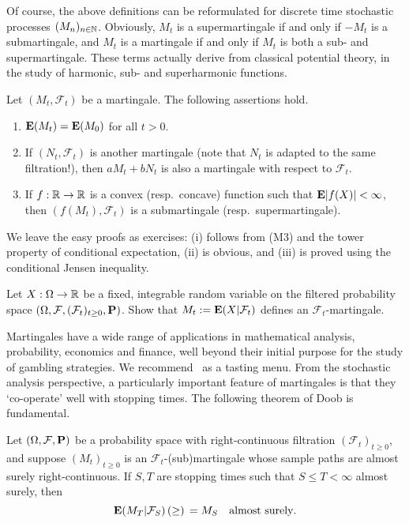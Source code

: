 Of course, the above definitions can be reformulated for discrete time stochastic processes $(M_n)_{n\in\mathbb{N}}$. Obviously, $M_t$ is a supermartingale if and only if $-M_t$ is a submartingale, and $M_t$ is a martingale if and only if $M_t$ is both a sub- and supermartingale. These terms actually derive from classical potential theory, in the study of harmonic, sub- and superharmonic functions.

\begin{proposition}
Let $(M_t,\mathcal{F}_t)$ be a martingale. The following assertions hold.
\begin{enumerate}[\upshape (i)]
    \item $\mathbf{E}(M_t) = \mathbf{E}(M_0)$ for all $t > 0$.
    \item If $(N_t,\mathcal{F}_t)$ is another martingale (note that $N_t$ is adapted to the same filtration!), then $aM_t + bN_t$ is also a martingale with respect to $\mathcal{F}_t$.
    \item If $f:\mathbb{R}\to\mathbb{R}$ is a convex (resp.\ concave) function such that $\mathbf{E}|f(X)| <\infty$, then $(f(M_t),\mathcal{F}_t)$ is a submartingale (resp.\ supermartingale).
\end{enumerate}
\end{proposition}
We leave the easy proofs as exercises: (i) follows from (M3) and the tower property of conditional expectation, (ii) is obvious, and (iii) is proved using the conditional Jensen inequality.

\begin{exercise}
Let $X:\Omega\to\mathbb{R}$ be a fixed, integrable random variable on the filtered probability space $(\Omega,\mathcal{F},(\mathcal{F}_t)_{t\ge 0},\mathbf{P})$. Show that $M_t:=\mathbf{E}(X|\mathcal{F}_t)$ defines an $\mathcal{F}_t$-martingale.
\end{exercise}

Martingales have a wide range of applications in mathematical analysis, probability, economics and finance, well beyond their initial purpose for the study of gambling strategies. We recommend~\cite[Chapter 15]{Wil} as a tasting menu. From the stochastic analysis perspective, a particularly important feature of martingales is that they `co-operate' well with stopping times. The following theorem of Doob is fundamental.

\begin{theorem}
\label{thm:doob-stop}
    Let $(\Omega,\mathcal{F},\mathbf{P})$ be a probability space with right-continuous filtration $(\mathcal{F}_t)_{t\ge 0}$, and suppose $(M_t)_{t\ge 0}$ is an $\mathcal{F}_t$-(sub)martingale whose sample paths are almost surely right-continuous. If $S,T$ are stopping times such that $S\le T<\infty$ almost surely, then
    \begin{equation}
        \mathbf{E}(M_T|\mathcal{F}_S) \,(\ge)\, = M_S \quad\text{almost surely}.
    \end{equation}
\end{theorem}

